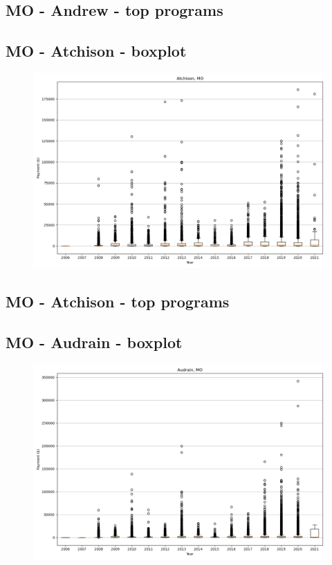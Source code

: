 \subsection*{MO - Andrew - top programs}

\newpage
\subsection*{MO - Atchison - boxplot}
\begin{figure}[h]
\centering
\includegraphics[width=7in]{../output/boxplots/counties/Atchison-MO_boxplot.png}
\end{figure}


\subsection*{MO - Atchison - top programs}

\newpage
\subsection*{MO - Audrain - boxplot}
\begin{figure}[h]
\centering
\includegraphics[width=7in]{../output/boxplots/counties/Audrain-MO_boxplot.png}
\end{figure}


